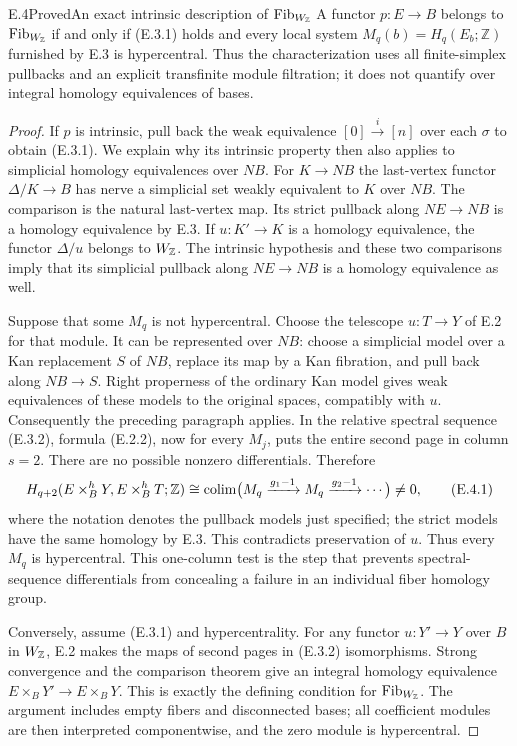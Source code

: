 \begin{claim}{E.4}{Proved}{An exact intrinsic description of $\operatorname{Fib}_{W_{\mathbb Z}}$}
A functor $p:E\to B$ belongs to $\operatorname{Fib}_{W_{\mathbb Z}}$ if and only if
(E.3.1) holds and every local system
$M_q(b)=H_q(E_b;\mathbb Z)$ furnished by E.3 is hypercentral.
Thus the characterization uses all finite-simplex pullbacks and
an explicit transfinite module filtration; it does not quantify
over integral homology equivalences of bases.
\end{claim}
\begin{proof}
If $p$ is intrinsic, pull back the weak equivalence
$[0]\xrightarrow{i}[n]$ over each $\sigma$ to obtain (E.3.1).
We explain why its intrinsic property then also applies to
simplicial homology equivalences over $NB$. For $K\to NB$ the
last-vertex functor $\Delta/K\to B$ has nerve a simplicial set
weakly equivalent to $K$ over $NB$. The comparison is the natural
last-vertex map. Its strict pullback along $NE\to NB$ is a homology
equivalence by E.3. If $u:K'\to K$ is a homology equivalence, the
functor $\Delta/u$ belongs to $W_{\mathbb Z}$. The intrinsic hypothesis and
these two comparisons imply that its simplicial pullback along
$NE\to NB$ is a homology equivalence as well.

Suppose that some $M_q$ is not hypercentral. Choose the telescope
$u:T\to Y$ of E.2 for that module. It can be represented over $NB$:
choose a simplicial model over a Kan replacement $S$ of $NB$, replace
its map by a Kan fibration, and pull back along $NB\to S$. Right
properness of the ordinary Kan model gives weak equivalences of
these models to the original spaces, compatibly with $u$.
Consequently the preceding paragraph applies. In the relative
spectral sequence (E.3.2), formula (E.2.2), now for every $M_j$,
puts the entire second page in column $s=2$. There are no possible
nonzero differentials. Therefore
\[
 H_{q+2}(E\times_B^hY,E\times_B^hT;\mathbb Z)
   \cong\operatorname*{colim}\bigl(M_q\xrightarrow{g_1-1}M_q
                          \xrightarrow{g_2-1}\cdots\bigr)\ne0,
                                                               \tag{E.4.1}
\]
where the notation denotes the pullback models just specified;
the strict models have the same homology by E.3.
This contradicts preservation of $u$. Thus every $M_q$ is
hypercentral. This one-column test is the step that prevents
spectral-sequence differentials from concealing a failure in an
individual fiber homology group.

Conversely, assume (E.3.1) and hypercentrality. For any functor
$u:Y'\to Y$ over $B$ in $W_{\mathbb Z}$, E.2 makes the maps of second pages
in (E.3.2) isomorphisms. Strong convergence and the comparison
theorem give an integral homology equivalence
$E\times_BY'\to E\times_BY$. This is exactly the defining
condition for $\operatorname{Fib}_{W_{\mathbb Z}}$.
The argument includes empty fibers and disconnected bases; all
coefficient modules are then interpreted componentwise, and the
zero module is hypercentral.
\end{proof}

